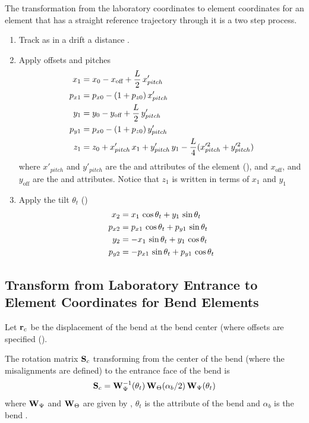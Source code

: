 The transformation from the laboratory coordinates to element
coordinates for an element that has a straight reference trajectory
through it is a two step process.
\begin{enumerate}
\setlength{\itemsep}{0pt}
\item
Track as in a drift a distance .
\item
Apply offsets and pitches
\vspace{-1ex}
\begin{align}
  x_1    &= x_0 - x_{\text{off}} + \frac{L}{2} \, x'_{pitch} \nonumber \\
  p_{x1} &= p_{x0} - (1 + p_{z0}) \, x'_{pitch} \nonumber \\
  y_1    &= y_0 - y_{\text{off}} + \frac{L}{2} \, y'_{pitch} \\
  p_{y1} &= p_{x0} - (1 + p_{z0}) \, y'_{pitch} \nonumber \\
  z_1    &= z_0 + x'_{pitch} \, x_1 + y'_{pitch} \, y_1 - 
    \frac{L}{4} (x^{\prime2}_{pitch} + y^{\prime2}_{pitch}) \nonumber
\end{align}
where $x'_{pitch}$ and $y'_{pitch}$ are the  and
 attributes of the element (), and
$x_{\text{off}}$, and $y_{\text{off}}$ are the  and
 attributes.
Notice that $z_1$ is written in terms of $x_1$ and $y_1$
\item
Apply the tilt $\theta_t$ ()
\vspace{-1ex}
\begin{align}
  x_2    &=  x_1    \, \cos\theta_t + y_1    \, \sin\theta_t \nonumber \\
  p_{x2} &=  p_{x1} \, \cos\theta_t + p_{y1} \, \sin\theta_t \nonumber \\
  y_2    &= -x_1    \, \sin\theta_t + y_1    \, \cos\theta_t \\
  p_{y2} &= -p_{x1} \, \sin\theta_t + p_{y1} \, \cos\theta_t \nonumber
\end{align}
\end{enumerate}

\subsection{Transform from Laboratory Entrance to Element Coordinates for Bend Elements}

Let ${\bf r}_c$ be the displacement of the bend at the bend center (where
offsets are specified ().

The rotation matrix ${\bf S}_c$ transforming
from the center of the bend (where the misalignments are defined) to the
entrance face of the bend is
\begin{align}
  {\bf S}_c &= {\bf W}_\Psi^{-1} (\theta_t) \, {\bf W}_\Theta (\alpha_b/2) \, {\bf W}_\Psi (\theta_t) \\
\end{align}
where ${\bf W}_\Psi$ and ${\bf W}_\Theta$ are given by ,
$\theta_t$ is the  attribute of the bend and $\alpha_b$
is the bend .

